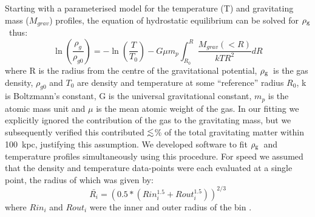 \documentclass{emulateapj}
\def\spose#1{\hbox to 0pt{#1\hss}}
\def\ltsim{$\mathrel{\spose{\lower 3pt\hbox{$\sim$}} 
        \raise 2.0pt\hbox{$<$}}$\thinspace}
\newcommand{\rhog}{${\rm \rho_g}$}
\begin{document}
Starting with a parameterised 
model for the temperature (T) and gravitating mass ($M_{grav}$) 
profiles, the equation of 
hydrostatic equilibrium can be solved for \rhog\ thus:
\begin{equation} 
\ln \left( \frac{\rho_g}{\rho_{g0}} \right) = - \ln \left( \frac{T}{T_0} \right)
- G \mu m_p \int^R_{R_0} \frac{M_{grav}(<R)}{kT R^2} dR
\label{eqn_hydrostatic_rho}
\end{equation}
where R is the radius from the centre of the gravitational potential,
\rhog\ is the gas density, $\rho_{g0}$ and $T_0$ are density and temperature
at some ``reference'' radius $R_0$,
k is Boltzmann's constant, G is the universal gravitational constant,
$m_p$ is the atomic mass unit and $\mu$ is the mean atomic weight of the gas.
In our fitting we explicitly ignored the contribution of the gas to
the gravitating mass, but we subsequently verified this contributed
\ltsim 1\% of the total gravitating matter within 100~kpc, justifying
this assumption.
We developed software to fit \rhog\ and temperature
profiles simultaneously using this procedure. 
For speed we assumed that the density and temperature data-points were 
each evaluated at a single point, the radius of which was given by:
\begin{equation}
\bar{R_i} = \left( 0.5*(Rin_i^{1.5}+Rout_i^{1.5}) \right)^{2/3} \label{eqn_radius}
\end{equation}
where $Rin_i$ and $Rout_i$ were the inner and outer radius of the bin
\citep[see][]{lewis03a}.
\end{document}
